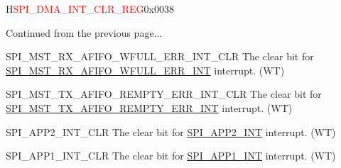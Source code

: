\addtocounter{Regfloat}{-1}
\begin{register}{H}{\textcolor{red}{SPI\_DMA\_INT\_CLR\_REG}}{0x{}0038}
\begin{regdesc}\begin{reglist}
\item [Continued from the previous page...]
\label{fielddesc:SPIMSTRXAFIFOWFULLERRINTCLR}\item [SPI\_MST\_RX\_AFIFO\_WFULL\_ERR\_INT\_CLR] The clear bit for \hyperref[int:SPIMSTRXAFIFOWFULLERRINT]{SPI\_MST\_RX\_AFIFO\_WFULL\_ERR\_INT} interrupt. (WT)
\label{fielddesc:SPIMSTTXAFIFOREMPTYERRINTCLR}\item [SPI\_MST\_TX\_AFIFO\_REMPTY\_ERR\_INT\_CLR] The clear bit for \hyperref[int:SPIMSTTXAFIFOREMPTYERRINT]{SPI\_MST\_TX\_AFIFO\_REMPTY\_ERR\_INT} interrupt. (WT)
\label{fielddesc:SPIAPP2INTCLR}\item [SPI\_APP2\_INT\_CLR] The clear bit for \hyperref[int:SPIAPP2INT]{SPI\_APP2\_INT} interrupt. (WT)
\label{fielddesc:SPIAPP1INTCLR}\item [SPI\_APP1\_INT\_CLR] The clear bit for \hyperref[int:SPIAPP1INT]{SPI\_APP1\_INT} interrupt. (WT)
\end{reglist}\end{regdesc}
\end{register}


